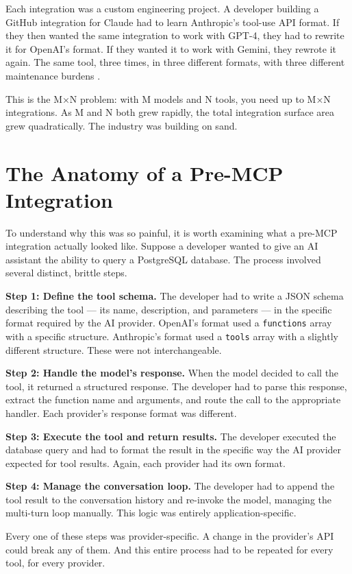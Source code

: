 Each integration was a custom engineering project. A developer building a GitHub integration for Claude had to learn Anthropic's tool-use API format. If they then wanted the same integration to work with GPT-4, they had to rewrite it for OpenAI's format. If they wanted it to work with Gemini, they rewrote it again. The same tool, three times, in three different formats, with three different maintenance burdens \cite{anthropic2024mcp}.

This is the M×N problem: with M models and N tools, you need up to M×N integrations. As M and N both grew rapidly, the total integration surface area grew quadratically. The industry was building on sand.

\section{The Anatomy of a Pre-MCP Integration}
To understand why this was so painful, it is worth examining what a pre-MCP integration actually looked like. Suppose a developer wanted to give an AI assistant the ability to query a PostgreSQL database. The process involved several distinct, brittle steps.

\textbf{Step 1: Define the tool schema.} The developer had to write a JSON schema describing the tool — its name, description, and parameters — in the specific format required by the AI provider. OpenAI's format used a \texttt{functions} array with a specific structure. Anthropic's format used a \texttt{tools} array with a slightly different structure. These were not interchangeable.

\textbf{Step 2: Handle the model's response.} When the model decided to call the tool, it returned a structured response. The developer had to parse this response, extract the function name and arguments, and route the call to the appropriate handler. Each provider's response format was different.

\textbf{Step 3: Execute the tool and return results.} The developer executed the database query and had to format the result in the specific way the AI provider expected for tool results. Again, each provider had its own format.

\textbf{Step 4: Manage the conversation loop.} The developer had to append the tool result to the conversation history and re-invoke the model, managing the multi-turn loop manually. This logic was entirely application-specific.

Every one of these steps was provider-specific. A change in the provider's API could break any of them. And this entire process had to be repeated for every tool, for every provider.

